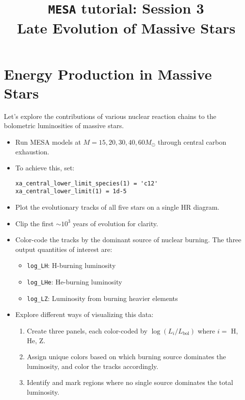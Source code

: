 \documentclass[11pt,a4paper]{article}
\begin{document}
\title{
    \textbf{\texttt{MESA} tutorial: Session 3} \\
    \textbf{\Large Late Evolution of Massive Stars}
}
\date{}
\maketitle
\vspace{-1cm}


\section{Energy Production in Massive Stars}

Let's explore the contributions of various nuclear reaction chains to the bolometric luminosities of massive stars.

\begin{itemize}[leftmargin=1.5em]
    \item Run MESA models at $M = 15, 20, 30, 40, 60 M_\odot$ through central carbon exhaustion.
    \item To achieve this, set:

    \begin{lstlisting}
xa_central_lower_limit_species(1) = 'c12'
xa_central_lower_limit(1) = 1d-5
    \end{lstlisting}

    \item Plot the evolutionary tracks of all five stars on a single HR diagram.
    \item Clip the first $\sim 10^3$ years of evolution for clarity.
    \item Color-code the tracks by the dominant source of nuclear burning. The three output quantities of interest are:
    \begin{itemize}
        \item \texttt{log\_LH}: H-burning luminosity
        \item \texttt{log\_LHe}: He-burning luminosity
        \item \texttt{log\_LZ}: Luminosity from burning heavier elements
    \end{itemize}
    \item Explore different ways of visualizing this data:
    \begin{enumerate}[label=(\alph*)]
        \item Create three panels, each color-coded by $\log (L_i/L_{\text{bol}})$ where $i = $ H, He, Z.
        \item Assign unique colors based on which burning source dominates the luminosity, and color the tracks accordingly.
        \item Identify and mark regions where no single source dominates the total luminosity.
    \end{enumerate}
\end{itemize}
\end{document}
